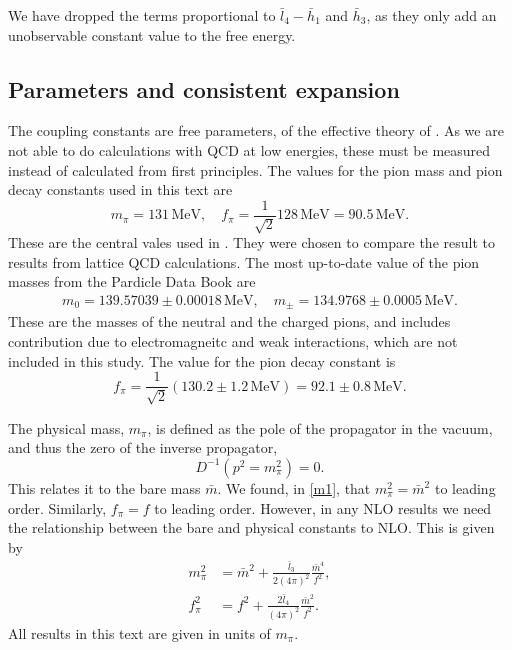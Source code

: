 We have dropped the terms proportional to $\bar l_4 - \bar h_1$ and $\bar h_3$, as they only add an unobservable constant value to the free energy.


\subsection*{Parameters and consistent expansion}

The coupling constants are free parameters, of the effective theory of \chpt.
As we are not able to do calculations with QCD at low energies, these must be measured instead of calculated from first principles.
The values for the pion mass and pion decay constants used in this text are
\begin{equation}
    m_\pi = 131 \, \mathrm{MeV}, \quad 
    f_\pi = \frac{1}{\sqrt 2} 128 \, \mathrm{MeV} = 90.5 \, \mathrm{MeV}.
\end{equation}
These are the central vales used in \cite{Andersen:two-flavor-chpt,mojahed}.
They were chosen to compare the result to results from lattice QCD calculations.
The most up-to-date value of the pion masses from the Pardicle Data Book are~\cite{PDG}
\begin{eqnarray}
    m_0 = 139.57039\pm0.00018\, \text{MeV}, \quad
    m_\pm = 134.9768\pm0.0005\, \text{MeV}.
\end{eqnarray}
These are the masses of the neutral and the charged pions, and includes contribution due to electromagneitc and weak interactions, which are not included in this study.
The value for the pion decay constant is~\cite{PDG}
\begin{equation}
    f_\pi = \frac{1}{\sqrt{2}} (130.2 \pm 1.2 \, \text{MeV})
    = 92.1 \pm 0.8 \, \text{MeV}.
\end{equation}

The physical mass, $m_\pi$, is defined as the pole of the propagator in the vacuum, and thus the zero of the inverse propagator,
\begin{equation}
    D^{-1}(p^2 = m_\pi^2) = 0.
\end{equation}
This relates it to the bare mass $\bar m$.
We found, in \cref{m1}, that $m_\pi^2 = \bar m^2$ to leading order.
Similarly, $f_\pi = f$ to leading order.
However, in any NLO results we need the relationship between the bare and physical constants to NLO.
This is given by~\cite{Gasser-Leutwyler:chiral}
\begin{align}
    \label{equation bare mass}
    m_\pi^2 & = \bar m^2 + \frac{\bar l_3}{2 (4\pi)^2} \frac{\bar m^4}{f^2}, \\
    \label{equation bare decay constant}
    f_\pi^2 & = f^2 + \frac{2\bar l_4}{(4\pi)^2} \frac{\bar m^2}{f^2}.
\end{align}
All results in this text are given in units of $m_\pi$.

